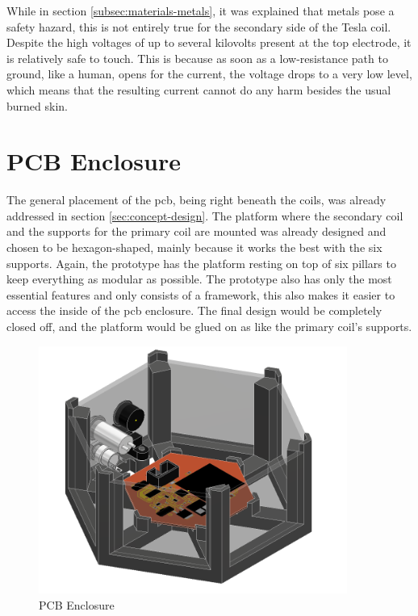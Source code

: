 While in section \ref{subsec:materials-metals}, it was explained that metals pose a safety hazard, this is not entirely true for the secondary side of the Tesla coil. Despite the high voltages of up to several kilovolts present at the top electrode, it is relatively safe to touch. This is because as soon as a low-resistance path to ground, like a human, opens for the current, the voltage drops to a very low level, which means that the resulting current cannot do any harm besides the usual burned skin.

\section{PCB Enclosure}

The general placement of the \gls{pcb}, being right beneath the coils, was already addressed in section \ref{sec:concept-design}. The platform where the secondary coil and the supports for the primary coil are mounted was already designed and chosen to be hexagon-shaped, mainly because it works the best with the six supports. Again, the prototype has the platform resting on top of six pillars to keep everything as modular as possible. The prototype also has only the most essential features and only consists of a framework, this also makes it easier to access the inside of the \gls{pcb} enclosure. The final design would be completely closed off, and the platform would be glued on as like the primary coil’s supports.

\begin{figure}[h!]
    \centering
    \includegraphics[width=0.9\textwidth]{kassandra/resources/JerJerWoBistDu.PNG}
    \caption{PCB Enclosure}
    \label{fig:bottom-bau}
\end{figure}

